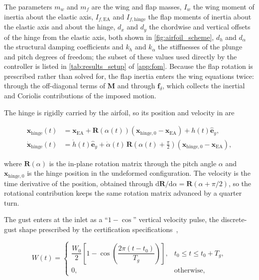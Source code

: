 The parameters $m_w$ and $m_f$ are the wing and flap masses, $I_w$ the wing moment of inertia about the elastic axis, $I_{f,\mathrm{EA}}$ and $I_{f,\mathrm{hinge}}$ the flap moments of inertia about the elastic axis and about the hinge, $d_x$ and $d_y$ the chordwise and vertical offsets of the hinge from the elastic axis, both shown in \cref{fig:airfoil_scheme}, $d_h$ and $d_\alpha$ the structural damping coefficients and $k_h$ and $k_\alpha$ the stiffnesses of the plunge and pitch degrees of freedom; the subset of these values used directly by the controller is listed in \cref{tab:results_setup} of \cref{app:fom}. Because the flap rotation is prescribed rather than solved for, the flap inertia enters the wing equations twice: through the off-diagonal terms of $\mathbf{M}$ and through $\mathbf{f}_\delta$, which collects the inertial and Coriolis contributions of the imposed motion.

The hinge is rigidly carried by the airfoil, so its position and velocity in  are

\begin{equation}
\begin{aligned}
\mathbf{x}_{\mathrm{hinge}}(t)
&=
\mathbf{x}_{\mathrm{EA}}
+
\mathbf{R}(\alpha(t))
\left(
\mathbf{x}_{\mathrm{hinge},0}
-
\mathbf{x}_{\mathrm{EA}}
\right)
+
h(t)\hat{\mathbf e}_y,
\\[3pt]
\dot{\mathbf{x}}_{\mathrm{hinge}}(t)
&=
\dot h(t)\hat{\mathbf e}_y
+
\dot\alpha(t)\,
\mathbf{R}\!\left(\alpha(t)+\tfrac{\pi}{2}\right)
\left(
\mathbf{x}_{\mathrm{hinge},0}
-
\mathbf{x}_{\mathrm{EA}}
\right),
\end{aligned}
\label{eq:hinge}
\end{equation}

where $\mathbf{R}(\alpha)$ is the in-plane rotation matrix through the pitch angle $\alpha$ and $\mathbf{x}_{\mathrm{hinge},0}$ is the hinge position in the undeformed configuration. The velocity is the time derivative of the position, obtained through $\mathrm{d}\mathbf{R}/\mathrm{d}\alpha = \mathbf{R}(\alpha+\pi/2)$, so the rotational contribution keeps the same rotation matrix advanced by a quarter turn.

The gust enters at the inlet as a ``$1-\cos$'' vertical velocity pulse, the discrete-gust shape prescribed by the certification specifications~\cite{EASA_CS25},

\begin{equation}
W(t)=
\begin{cases}
\dfrac{W_0}{2}
\left[1-\cos\!\left(\dfrac{2\pi(t-t_0)}{T_g}\right)\right],
& t_0\le t\le t_0+T_g,\\[1.2em]
0, & \text{otherwise},
\end{cases}
\label{eq:gust}
\end{equation}

